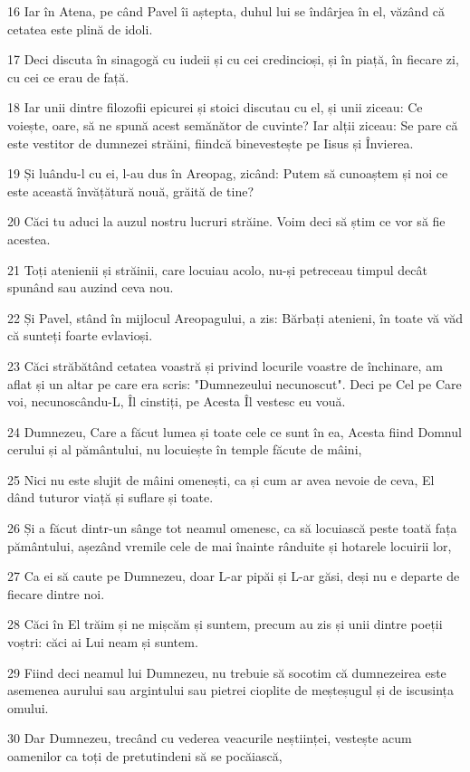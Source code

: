 \par 16 Iar în Atena, pe când Pavel îi aștepta, duhul lui se îndârjea în el, văzând că cetatea este plină de idoli.
\par 17 Deci discuta în sinagogă cu iudeii și cu cei credincioși, și în piață, în fiecare zi, cu cei ce erau de față.
\par 18 Iar unii dintre filozofii epicurei și stoici discutau cu el, și unii ziceau: Ce voiește, oare, să ne spună acest semănător de cuvinte? Iar alții ziceau: Se pare că este vestitor de dumnezei străini, fiindcă binevestește pe Iisus și Învierea.
\par 19 Și luându-l cu ei, l-au dus în Areopag, zicând: Putem să cunoaștem și noi ce este această învățătură nouă, grăită de tine?
\par 20 Căci tu aduci la auzul nostru lucruri străine. Voim deci să știm ce vor să fie acestea.
\par 21 Toți atenienii și străinii, care locuiau acolo, nu-și petreceau timpul decât spunând sau auzind ceva nou.
\par 22 Și Pavel, stând în mijlocul Areopagului, a zis: Bărbați atenieni, în toate vă văd că sunteți foarte evlavioși.
\par 23 Căci străbătând cetatea voastră și privind locurile voastre de închinare, am aflat și un altar pe care era scris: "Dumnezeului necunoscut". Deci pe Cel pe Care voi, necunoscându-L, Îl cinstiți, pe Acesta Îl vestesc eu vouă.
\par 24 Dumnezeu, Care a făcut lumea și toate cele ce sunt în ea, Acesta fiind Domnul cerului și al pământului, nu locuiește în temple făcute de mâini,
\par 25 Nici nu este slujit de mâini omenești, ca și cum ar avea nevoie de ceva, El dând tuturor viață și suflare și toate.
\par 26 Și a făcut dintr-un sânge tot neamul omenesc, ca să locuiască peste toată fața pământului, așezând vremile cele de mai înainte rânduite și hotarele locuirii lor,
\par 27 Ca ei să caute pe Dumnezeu, doar L-ar pipăi și L-ar găsi, deși nu e departe de fiecare dintre noi.
\par 28 Căci în El trăim și ne mișcăm și suntem, precum au zis și unii dintre poeții voștri: căci ai Lui neam și suntem.
\par 29 Fiind deci neamul lui Dumnezeu, nu trebuie să socotim că dumnezeirea este asemenea aurului sau argintului sau pietrei cioplite de meșteșugul și de iscusința omului.
\par 30 Dar Dumnezeu, trecând cu vederea veacurile neștiinței, vestește acum oamenilor ca toți de pretutindeni să se pocăiască,
